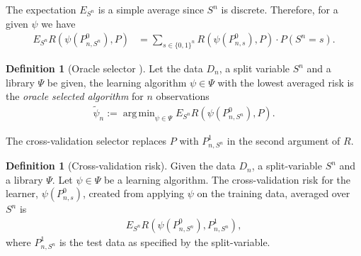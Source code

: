 \documentclass[11pt, a4paper]{article}
\theoremstyle{definition}
\newtheorem{definition}[theorem]{Definition}
\theoremstyle{remark}
\DeclareMathOperator*{\argmin}{arg\,min}
\newcommand{\la}{\psi}
\newcommand{\Sn}{S^n}
\newcommand{\lib}{\Psi}
\begin{document}
\noindent The expectation $ E_{\Sn} $ is a simple average since $ \Sn $ is discrete. Therefore, for a given $ \la $ we have 
\begin{align*}
    E_{\Sn} R( \la(P_{n,\Sn}^{0}), P) &= \sum_{s \in \{0,1\}^{n}} R(\la(P_{n, s}^{0}), P) \cdot P(\Sn = s). 
\end{align*}
\begin{definition}[Oracle selector \parencite{laan03}]
Let the data $ D_n $, a split variable $ \Sn $ and a library $ \lib $ be given, the learning algorithm $ \la \in \lib $ with the lowest averaged risk is the \textit{oracle selected algorithm} for $ n $ observations
    \begin{align*}
        \tilde{\la}_n := \argmin_{\la \in \lib} E_{\Sn} R(\la(P_{n,\Sn}^0 ) , P).
    \end{align*}
\end{definition}

\noindent The cross-validation selector replaces $ P $ with $ P_{n, \Sn}^{1} $ in the second argument of $ R $.
\begin{definition}[Cross-validation risk]
     Given the data $D_n$, a split-variable $\Sn$ and a library $ \lib $. Let $ \la \in \lib $ be a learning algorithm. The cross-validation risk for the learner, $\la(P_{n,s}^0)$, created from applying $ \la $ on the training data, averaged over $ \Sn $ is  
    \begin{align*}
        E_{\Sn} R( \la(P_{n,\Sn}^{0}), P_{n, \Sn}^{1}),
    \end{align*}
    where $ P_{n,\Sn}^{1} $ is the test data as specified by the split-variable.
\end{definition}
\end{document}
